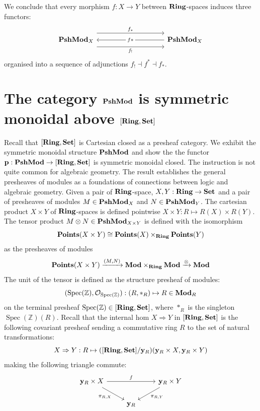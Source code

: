 \documentclass[8pt]{article}
\theoremstyle{definition}
\theoremstyle{definition}
\theoremstyle{definition}
\theoremstyle{definition}
\theoremstyle{definition}
\theoremstyle{definition}
\theoremstyle{definition}
\theoremstyle{definition}
\theoremstyle{definition}
\theoremstyle{definition}
\theoremstyle{definition}
\theoremstyle{definition}
\theoremstyle{definition}
\theoremstyle{definition}
\theoremstyle{question}
\begin{document}
We conclude that every morphism $f : X \to Y$ between ${\bf Ring}$-spaces induces three functors:
\[
\begin{tikzcd}
  {\bf PshMod}_X \ar[rrrr, shift left=4, "f_*"] \ar[rrrr, shift right=4, "f_!"'] &&&& {\bf PshMod}_X \ar[llll, "f*" description]
\end{tikzcd}
\]
organised into a sequence of adjunctions $f_! \dashv f^* \dashv f_*$.

\section{The category ${\bf PshMod}$ is symmetric monoidal above $[{\bf Ring}, {\bf Set}]$}

Recall that $[{\bf Ring}, {\bf Set}]$ is Cartesian closed as a presheaf category. We exhibit the symmetric monoidal structure ${\bf PshMod}$ and show the
the functor ${\bf p} : {\bf PshMod} \to [{\bf Ring}, {\bf Set}]$ is symmetric monoidal closed. The instruction is not quite common for algebraic geometry.
The result establishes the general presheaves of modules as a foundations of connections between logic and algebraic geometry. Given a pair of ${\bf Ring}$-space,
$X, Y : {\bf Ring} \to {\bf Set}$ and a pair of presheaves of modules $M \in {\bf PshMod}_X$ and $N \in {\bf PshMod}_Y$. The cartesian product 
$X \times Y$ of ${\bf Ring}$-spaces is defined pointwise $X \times Y : R \mapsto R(X) \times R(Y)$. The tensor product 
$M \otimes N \in {\bf PshMod}_{X \times Y}$ is defined with the isomorphism
\[
{\bf Points}(X \times Y) \cong {\bf Points}(X) \times_{\bf Ring} {\bf Points}(Y)
\]
as the presheaves of modules
\[
{\bf Points}(X \times Y) \xrightarrow{(M,N)} {\bf Mod} \times_{\bf Ring} {\bf Mod} \xrightarrow{\otimes} {\bf Mod}
\]
The unit of the tensor is defined as the structure presheaf of modules:
\[
(\operatorname{Spec}(\mathbb{Z}), \mathcal{O}_{\operatorname{Spec}(\mathbb{Z})}) : (R,*_R) \mapsto R \in {\bf Mod}_R
\]
on the terminal presheaf $\operatorname{Spec}(\mathbb{Z}) \in [{\bf Ring}, {\bf Set}]$, where $*_R$ is the singleton $\operatorname{Spec}(\mathbb{Z})(R)$.
Recall that the internal hom $X \Rightarrow Y$ in $[{\bf Ring}, {\bf Set}]$ is the following covariant presheaf sending a commutative ring $R$
to the set of natural transformations:
\[
X \Rightarrow Y : R \mapsto ([{\bf Ring}, {\bf Set}]/{\bf y}_R)({\bf y}_R \times X, {\bf y}_R \times Y)
\]
making the following triangle commute:
\[
\begin{tikzcd}
  {\bf y}_R \times X \ar[rr, "f"] \ar[dr, "\pi_{R, X}"'] && {\bf y}_R \times Y \ar[dl, "\pi_{R, Y}"] \\
  & {\bf y}_R
\end{tikzcd}
\]
\end{document}
